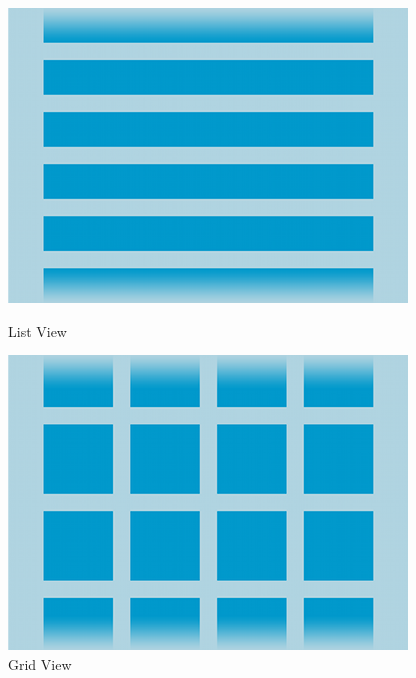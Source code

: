 \begin{figure}[H]
\centering
{}
  \includegraphics[width=\linewidth]{02-layouts/listview.png}
  \caption{List View}
\endminipage\hspace{1cm}
  \includegraphics[width=\linewidth]{02-layouts/gridview.png}
  \caption{Grid View}
\endminipage\hfill
\end{figure}


